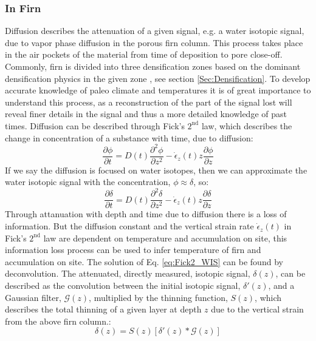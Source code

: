 \documentclass[../../CompleteThesis/Complete_1stDraft.tex]{subfiles}
\begin{document}
\subsubsection{In Firn}
Diffusion describes the attenuation of a given signal, e.g. a water isotopic signal, due to vapor phase diffusion in the porous firn column. This process takes place in the air pockets of the material from time of deposition to pore close-off. Commonly, firn is divided into three densification zones based on the dominant densification physics in the given zone \cite[Herron and Langway, 1980]{HerronLangway1980}, see section \ref{Sec:Densification}.
To develop accurate knowledge of paleo climate and temperatures it is of great importance to understand this process, as a reconstruction of the part of the signal lost will reveal finer details in the signal and thus a more detailed knowledge of past times. 
Diffusion can be described through Fick's $2^{\text{nd}}$ law, which describes the change in concentration of a substance with time, due to diffusion:
\begin{equation}
	\frac{\partial \phi}{\partial t} = D(t) \frac{\partial^2 \phi}{\partial z^2} - \dot{\epsilon}_z(t) z \frac{\partial \phi}{\partial z}
	\label{eq:Fick2_concentration}
\end{equation}
If we say the diffusion is focused on water isotopes, then we can approximate the water isotopic signal with the concentration, $\phi \approx \delta$, so:
\begin{equation}
	\frac{\partial \delta}{\partial t} = D(t) \frac{\partial^2 \delta}{\partial z^2} - \dot{\epsilon}_z(t) z \frac{\partial \delta}{\partial z}
	\label{eq:Fick2_WIS}
\end{equation}
Through attanuation with depth and time due to diffusion there is a loss of information. But the diffusion constant and the vertical strain rate $\dot{\epsilon}_z(t)$ in Fick's $2^{\text{nd}}$ law are dependent on temperature and accumulation on site, this information loss process can be used to infer temperature of firn and accumulation on site. 
The solution of Eq. \ref{eq:Fick2_WIS} can be found by deconvolution. The attenuated, directly measured, isotopic signal, $\delta(z)$, can be described as the convolution between the initial isotopic signal, $\delta '(z)$, and a Gaussian filter, $\mathcal{G}(z)$, multiplied by the thinning function, $S(z)$, which describes the total thinning of a given layer at depth $z$ due to the vertical strain from the above firn column.:
\begin{equation}
	\delta(z) = S(z)[\delta'(z)*\mathcal{G}(z)]
	\label{eq:diff_solution_conv}
\end{equation}
\end{document}
